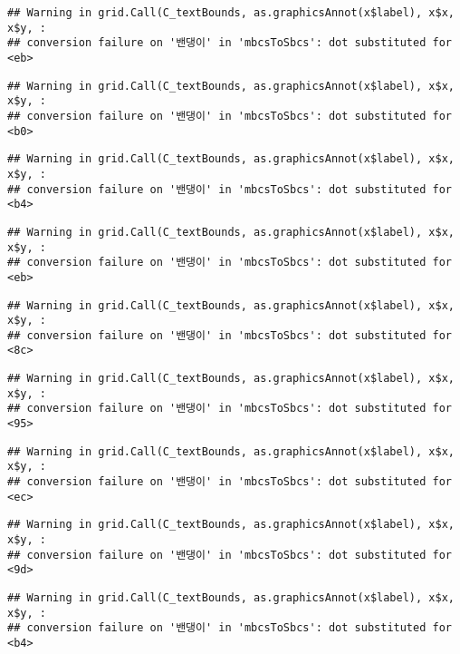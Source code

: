 \documentclass[
]{article}
\begin{document}
\begin{verbatim}
## Warning in grid.Call(C_textBounds, as.graphicsAnnot(x$label), x$x, x$y, :
## conversion failure on '밴댕이' in 'mbcsToSbcs': dot substituted for <eb>
\end{verbatim}

\begin{verbatim}
## Warning in grid.Call(C_textBounds, as.graphicsAnnot(x$label), x$x, x$y, :
## conversion failure on '밴댕이' in 'mbcsToSbcs': dot substituted for <b0>
\end{verbatim}

\begin{verbatim}
## Warning in grid.Call(C_textBounds, as.graphicsAnnot(x$label), x$x, x$y, :
## conversion failure on '밴댕이' in 'mbcsToSbcs': dot substituted for <b4>
\end{verbatim}

\begin{verbatim}
## Warning in grid.Call(C_textBounds, as.graphicsAnnot(x$label), x$x, x$y, :
## conversion failure on '밴댕이' in 'mbcsToSbcs': dot substituted for <eb>
\end{verbatim}

\begin{verbatim}
## Warning in grid.Call(C_textBounds, as.graphicsAnnot(x$label), x$x, x$y, :
## conversion failure on '밴댕이' in 'mbcsToSbcs': dot substituted for <8c>
\end{verbatim}

\begin{verbatim}
## Warning in grid.Call(C_textBounds, as.graphicsAnnot(x$label), x$x, x$y, :
## conversion failure on '밴댕이' in 'mbcsToSbcs': dot substituted for <95>
\end{verbatim}

\begin{verbatim}
## Warning in grid.Call(C_textBounds, as.graphicsAnnot(x$label), x$x, x$y, :
## conversion failure on '밴댕이' in 'mbcsToSbcs': dot substituted for <ec>
\end{verbatim}

\begin{verbatim}
## Warning in grid.Call(C_textBounds, as.graphicsAnnot(x$label), x$x, x$y, :
## conversion failure on '밴댕이' in 'mbcsToSbcs': dot substituted for <9d>
\end{verbatim}

\begin{verbatim}
## Warning in grid.Call(C_textBounds, as.graphicsAnnot(x$label), x$x, x$y, :
## conversion failure on '밴댕이' in 'mbcsToSbcs': dot substituted for <b4>
\end{verbatim}
\end{document}
